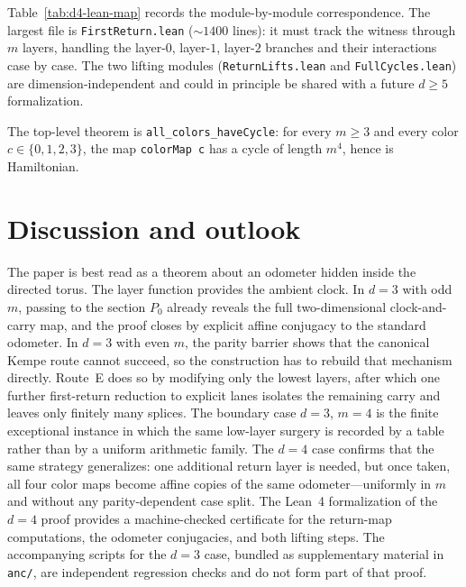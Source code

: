 \documentclass[11pt]{article}
\begin{document}
Table~\ref{tab:d4-lean-map} records the module-by-module correspondence.
The largest file is \texttt{FirstReturn.lean} (${\sim}1400$ lines): it must track the witness through $m$ layers, handling the layer-$0$, layer-$1$, layer-$2$ branches and their interactions case by case.
The two lifting modules (\texttt{ReturnLifts.lean} and \texttt{FullCycles.lean}) are dimension-independent and could in principle be shared with a future $d\ge 5$ formalization.

The top-level theorem is \texttt{all\_colors\_haveCycle}: for every $m\ge 3$ and every color $c\in\{0,1,2,3\}$, the map \texttt{colorMap~c} has a cycle of length $m^4$, hence is Hamiltonian.


\section{Discussion and outlook}\label{sec:discussion}

The paper is best read as a theorem about an odometer hidden inside the directed torus.
The layer function provides the ambient clock.
In $d=3$ with odd $m$, passing to the section $P_0$ already reveals the full two-dimensional clock-and-carry map, and the proof closes by explicit affine conjugacy to the standard odometer.
In $d=3$ with even $m$, the parity barrier shows that the canonical Kempe route cannot succeed, so the construction has to rebuild that mechanism directly.
Route~E does so by modifying only the lowest layers, after which one further first-return reduction to explicit lanes isolates the remaining carry and leaves only finitely many splices.
The boundary case $d=3$, $m=4$ is the finite exceptional instance in which the same low-layer surgery is recorded by a table rather than by a uniform arithmetic family.
The $d=4$ case confirms that the same strategy generalizes: one additional return layer is needed, but once taken, all four color maps become affine copies of the same odometer---uniformly in $m$ and without any parity-dependent case split.
The Lean~4 formalization of the $d=4$ proof provides a machine-checked certificate for the return-map computations, the odometer conjugacies, and both lifting steps.
The accompanying scripts for the $d=3$ case, bundled as supplementary material in \texttt{anc/}, are independent regression checks and do not form part of that proof.
\end{document}
